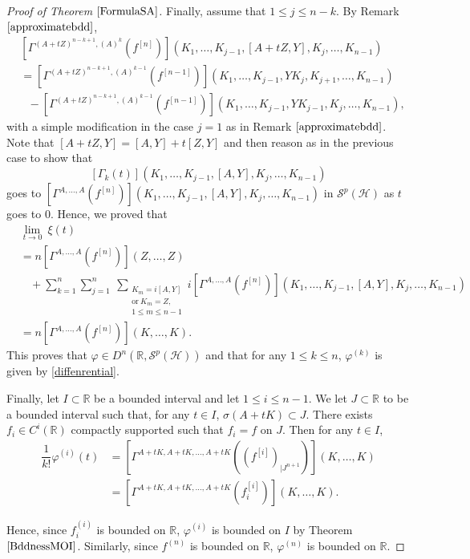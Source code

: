\documentclass[12pt]{amsart}
\theoremstyle{remark}
\renewcommand{\H}{\mbox{${\mathcal H}$}}
\def\Sc{{\mathcal{S}}}
\begin{document}
\begin{proof}[Proof of Theorem $\ref{FormulaSA}$]
Finally, assume that $1\leq j \leq n-k$. By Remark $\ref{approximatebdd}$,
\begin{align*}
& \left[\Gamma^{(A+tZ)^{n-k+1},(A)^k}(f^{[n]}) \right](K_1, \ldots, K_{j-1}, [A+tZ,Y], K_j, \ldots, K_{n-1}) \\
& = \left[\Gamma^{(A+tZ)^{n-k+1},(A)^{k-1}}(f^{[n-1]}) \right](K_1, \ldots, K_{j-1}, YK_j, K_{j+1}, \ldots, K_{n-1}) \\
& \ \ \ - \left[\Gamma^{(A+tZ)^{n-k+1},(A)^{k-1}}(f^{[n-1]}) \right](K_1, \ldots, K_{j-1}, YK_{j-1}, K_j, \ldots, K_{n-1}),
\end{align*}
with a simple modification in the case $j=1$ as in Remark $\ref{approximatebdd}$. Note that $[A+tZ,Y] = [A,Y] + t[Z,Y]$ and then reason as in the previous case to show that
$$
\left[\Gamma_k(t)\right](K_1, \ldots, K_{j-1}, [A,Y], K_j, \ldots, K_{n-1})
$$
goes to $\left[\Gamma^{A,\ldots, A}(f^{[n]}) \right](K_1, \ldots, K_{j-1}, [A,Y], K_j, \ldots, K_{n-1})$ in $\mathcal{S}^p(\mathcal{H})$ as $t$ goes to $0$.
Hence, we proved that
\begin{align*}
& \underset{t \to 0}{\lim} \ \xi(t) \\
& = n \left[\Gamma^{A,\ldots, A}(f^{[n]}) \right](Z, \ldots, Z) \\
& \ \ \ \ + \sum_{k=1}^n \sum_{j=1}^n \ \sum_{\substack{K_m = i[A,Y] \\\text{or} \ K_m=Z, \\ 1 \leq m \leq n-1}} i \left[ \Gamma^{A, \ldots, A}(f^{[n]}) \right] (K_1, \ldots, K_{j-1}, [A,Y], K_j, \ldots, K_{n-1}) \\
& = n \left[\Gamma^{A,\ldots, A}(f^{[n]}) \right](K, \ldots, K).
\end{align*}
This proves that $\varphi \in D^n(\mathbb{R},\Sc^p(\H))$ and that for any $1\leq k \leq n$, $\varphi^{(k)}$ is given by \eqref{diffenrential}.

Finally, let $I\subset \mathbb{R}$ be a bounded interval and let $1 \leq i \leq n-1$. We let $J \subset \mathbb{R}$ to be a bounded interval such that, for any $t\in I$, $\sigma(A+tK) \subset J$. There exists $f_i \in C^i(\mathbb{R})$ compactly supported such that $f_i = f$ on $J$. Then for any $t\in I$,
\begin{align*}
\dfrac{1}{k!} \varphi^{(i)}(t)
& = \left[ \Gamma^{A+tK, A+tK, \ldots, A+tK}((f^{[i]})_{|J^{n+1}}) \right] (K, \ldots, K) \\
& = \left[ \Gamma^{A+tK, A+tK, \ldots, A+tK}(f_i^{[i]}) \right] (K, \ldots, K).
\end{align*}



Hence, since $f_i^{(i)}$ is bounded on $\mathbb{R}$, $\varphi^{(i)}$ is bounded on $I$ by Theorem $\ref{BddnessMOI}$. Similarly, since $f^{(n)}$ is bounded on $\mathbb{R}$, $\varphi^{(n)}$ is bounded on $\mathbb{R}$.

\end{proof}
\end{document}
